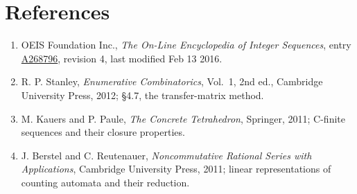 \documentclass[11pt]{article}
\theoremstyle{definition}
\begin{document}
\section{References}

\begin{enumerate}

\item OEIS Foundation Inc., \emph{The On-Line Encyclopedia of Integer Sequences}, entry \href{https://oeis.org/A268796}{A268796}, revision 4, last modified Feb 13 2016.

\item R. P. Stanley, \emph{Enumerative Combinatorics}, Vol.~1, 2nd ed., Cambridge University Press, 2012; \S4.7, the transfer-matrix method.

\item M. Kauers and P. Paule, \emph{The Concrete Tetrahedron}, Springer, 2011; C-finite sequences and their closure properties.

\item J. Berstel and C. Reutenauer, \emph{Noncommutative Rational Series with Applications}, Cambridge University Press, 2011; linear representations of counting automata and their reduction.

\end{enumerate}
\end{document}

